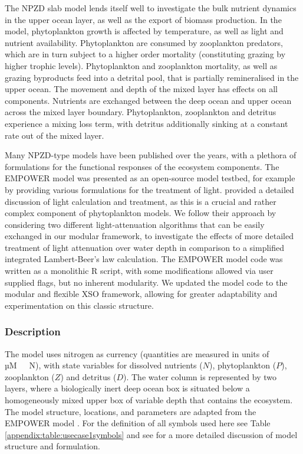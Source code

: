 \documentclass[journal abbreviation, manuscript]{copernicus}
\begin{document}
The NPZD slab model lends itself well to investigate the bulk nutrient dynamics in the upper ocean layer, as well as the export of biomass production. In the model, phytoplankton growth is affected by temperature, as well as light and nutrient availability. Phytoplankton are consumed by zooplankton predators, which are in turn subject to a higher order mortality (constituting grazing by higher trophic levels). Phytoplankton and zooplankton mortality, as well as grazing byproducts feed into a detrital pool, that is partially remineralised in the upper ocean. The movement and depth of the mixed layer has effects on all components. Nutrients are exchanged between the deep ocean and upper ocean across the mixed layer boundary. Phytoplankton, zooplankton and detritus experience a mixing loss term, with detritus additionally sinking at a constant rate out of the mixed layer.

Many NPZD-type models have been published over the years, with a plethora of formulations for the functional responses of the ecosystem components. The EMPOWER model was presented as an open-source model testbed, for example by providing various formulations for the treatment of light. \citet{Anderson2015c} provided a detailed discussion of light calculation and treatment, as this is a crucial and rather complex component of phytoplankton models. We follow their approach by considering two different light-attenuation algorithms that can be easily exchanged in our modular framework, to investigate the effects of more detailed treatment of light attenuation over water depth in comparison to a simplified integrated Lambert-Beer's law calculation. The EMPOWER model code was written as a monolithic R script, with some modifications allowed via user supplied flags, but no inherent modularity. We updated the model code to the modular and flexible XSO framework, allowing for greater adaptability and experimentation on this classic structure.

\subsubsection{Description}
The model uses nitrogen as currency (quantities are measured in units of \unit{µM \ N}), with state variables for dissolved nutrients ($N$), phytoplankton ($P$), zooplankton ($Z$) and detritus ($D$). The water column is represented by two layers, where a biologically inert deep ocean box is situated below a homogeneously mixed upper box of variable depth that contains the ecosystem. The model structure, locations, and parameters are adapted from the EMPOWER model \citep{Anderson2015c}. For the definition of all symbols used here see Table \ref{appendix:table:usecase1symbols} and see \citet{Anderson2015c} for a more detailed discussion of model structure and formulation.
\end{document}
